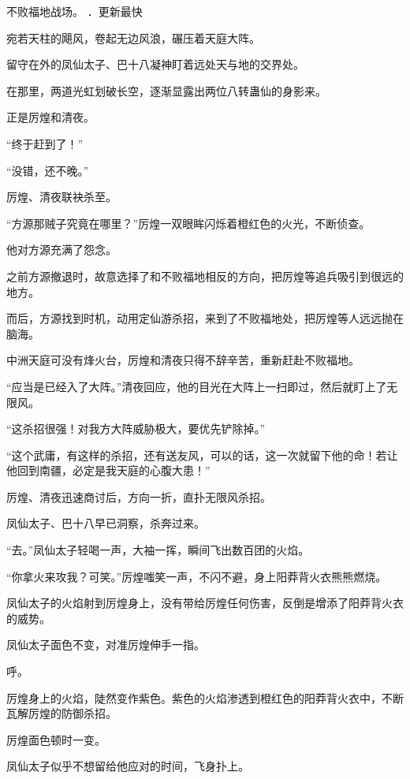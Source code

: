 
\begin{this_body}

不败福地战场。 ．更新最快

宛若天柱的飓风，卷起无边风浪，碾压着天庭大阵。

留守在外的凤仙太子、巴十八凝神盯着远处天与地的交界处。

在那里，两道光虹划破长空，逐渐显露出两位八转蛊仙的身影来。

正是厉煌和清夜。

“终于赶到了！”

“没错，还不晚。”

厉煌、清夜联袂杀至。

“方源那贼子究竟在哪里？”厉煌一双眼眸闪烁着橙红色的火光，不断侦查。

他对方源充满了怨念。

之前方源撤退时，故意选择了和不败福地相反的方向，把厉煌等追兵吸引到很远的地方。

而后，方源找到时机，动用定仙游杀招，来到了不败福地处，把厉煌等人远远抛在脑海。

中洲天庭可没有烽火台，厉煌和清夜只得不辞辛苦，重新赶赴不败福地。

“应当是已经入了大阵。”清夜回应，他的目光在大阵上一扫即过，然后就盯上了无限风。

“这杀招很强！对我方大阵威胁极大，要优先铲除掉。”

“这个武庸，有这样的杀招，还有送友风，可以的话，这一次就留下他的命！若让他回到南疆，必定是我天庭的心腹大患！”

厉煌、清夜迅速商讨后，方向一折，直扑无限风杀招。

凤仙太子、巴十八早已洞察，杀奔过来。

“去。”凤仙太子轻喝一声，大袖一挥，瞬间飞出数百团的火焰。

“你拿火来攻我？可笑。”厉煌嗤笑一声，不闪不避，身上阳莽背火衣熊熊燃烧。

凤仙太子的火焰射到厉煌身上，没有带给厉煌任何伤害，反倒是增添了阳莽背火衣的威势。

凤仙太子面色不变，对准厉煌伸手一指。

呼。

厉煌身上的火焰，陡然变作紫色。紫色的火焰渗透到橙红色的阳莽背火衣中，不断瓦解厉煌的防御杀招。

厉煌面色顿时一变。

凤仙太子似乎不想留给他应对的时间，飞身扑上。


\end{this_body}
